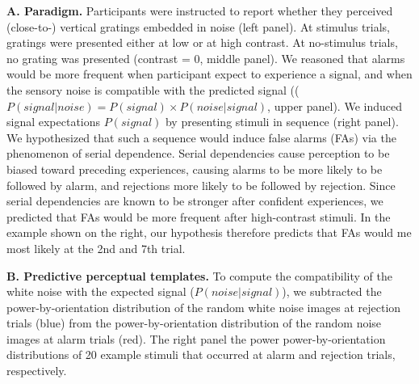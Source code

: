 \documentclass[
]{article}
\begin{document}
\textbf{A. Paradigm.} Participants were instructed to report whether
they perceived (close-to-) vertical gratings embedded in noise (left
panel). At stimulus trials, gratings were presented either at low or at
high contrast. At no-stimulus trials, no grating was presented (contrast
= 0, middle panel). We reasoned that alarms would be more frequent when
participant expect to experience a signal, and when the sensory noise is
compatible with the predicted signal
((\(P(signal|noise) = P(signal) \times P(noise|signal)\), upper panel).
We induced signal expectations \(P(signal)\) by presenting stimuli in
sequence (right panel). We hypothesized that such a sequence would
induce false alarms (FAs) via the phenomenon of serial dependence.
Serial dependencies cause perception to be biased toward preceding
experiences, causing alarms to be more likely to be followed by alarm,
and rejections more likely to be followed by rejection. Since serial
dependencies are known to be stronger after confident experiences, we
predicted that FAs would be more frequent after high-contrast stimuli.
In the example shown on the right, our hypothesis therefore predicts
that FAs would me most likely at the 2nd and 7th trial.

\textbf{B. Predictive perceptual templates.} To compute the
compatibility of the white noise with the expected signal
(\(P(noise|signal)\)), we subtracted the power-by-orientation
distribution of the random white noise images at rejection trials (blue)
from the power-by-orientation distribution of the random noise images at
alarm trials (red). The right panel the power power-by-orientation
distributions of 20 example stimuli that occurred at alarm and rejection
trials, respectively.
\end{document}
